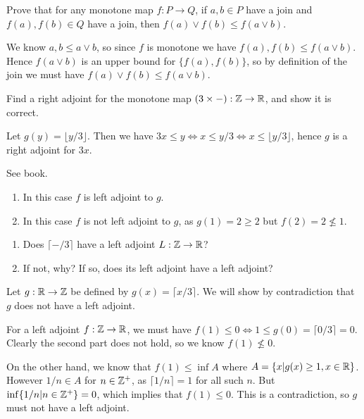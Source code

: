 Prove that for any monotone map $f:P\to Q$, if $a, b\in P$ have a join and $f(a), f(b)\in Q$ have a join, then $f(a)\lor f(b)\leq f(a\lor b)$.

\solution
We know $a,b\leq a\lor b$, so since $f$ is monotone we have $f(a), f(b)\leq f(a\lor b)$.  Hence $f(a\lor b)$ is an upper bound for $\{f(a), f(b)\}$, so by definition of the join we must have $f(a)\lor f(b)\leq f(a\lor b)$.

Find a right adjoint for the monotone map $(3\times -):\mathbb{Z}\to\mathbb{R}$, and show it is correct.

\solution
Let $g(y) = \lfloor y/3 \rfloor$.  Then we have $3x \leq y \iff x\leq y/3 \iff x\leq \lfloor y/3\rfloor$, hence $g$ is a right adjoint for $3x$.

See book.

\solution
\begin{enumerate}
	\item In this case $f$ is left adjoint to $g$.
	\item In this case $f$ is not left adjoint to $g$, as $g(1)=2\geq 2$ but $f(2)=2\nleq 1$.
\end{enumerate}

\begin{enumerate}
	\item Does $\lceil -/3\rceil$ have a left adjoint $L:\mathbb{Z}\to\mathbb{R}$?
	\item If not, why?  If so, does its left adjoint have a left adjoint?
\end{enumerate}

\solution
Let $g:\mathbb{R}\to\mathbb{Z}$ be defined by $g(x)=\lceil x/3 \rceil$.  We will show by contradiction that $g$ does not have a left adjoint.

For a left adjoint $f:\mathbb{Z}\to\mathbb{R}$, we must have $f(1)\leq 0 \iff 1\leq g(0)=\lceil 0/3\rceil=0$.  Clearly the second part does not hold, so we know $f(1)\nleq 0$.

On the other hand, we know that $f(1)\leq \inf A$ where $A=\{x | g(x)\geq 1, x\in\mathbb{R}\}$.  However $1/n\in A$ for $n\in\mathbb{Z}^+$, as $\lceil 1/n\rceil = 1$ for all such $n$.  But $\inf\{1/n | n\in\mathbb{Z}^+\}=0$, which implies that $f(1)\leq 0$.  This is a contradiction, so $g$ must not have a left adjoint.


